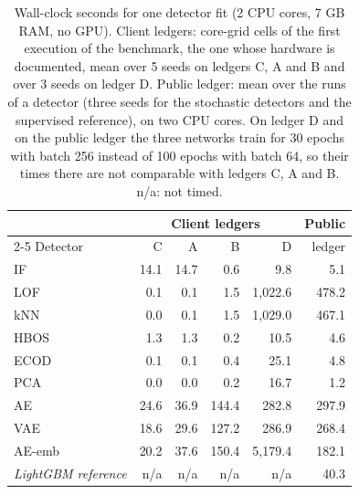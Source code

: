 \begin{table}[tbp]
\caption{Wall-clock seconds for one detector fit (2 CPU cores, 7 GB RAM, no GPU). Client ledgers: core-grid cells of the first execution of the benchmark, the one whose hardware is documented, mean over 5 seeds on ledgers C, A and B and over 3 seeds on ledger D. Public ledger: mean over the runs of a detector (three seeds for the stochastic detectors and the supervised reference), on two CPU cores. On ledger D and on the public ledger the three networks train for 30 epochs with batch 256 instead of 100 epochs with batch 64, so their times there are not comparable with ledgers C, A and B. n/a: not timed.}
\label{tab:s-runtime}
\centering
\footnotesize
\begin{tabular}{@{}lrrrrr@{}}
\toprule
 & \multicolumn{4}{c}{Client ledgers} & Public \\
\cmidrule(lr){2-5}
Detector & C & A & B & D & ledger \\
\midrule
IF & 14.1 & 14.7 & 0.6 & 9.8 & 5.1 \\
LOF & 0.1 & 0.1 & 1.5 & 1,022.6 & 478.2 \\
kNN & 0.0 & 0.1 & 1.5 & 1,029.0 & 467.1 \\
HBOS & 1.3 & 1.3 & 0.2 & 10.5 & 4.6 \\
ECOD & 0.1 & 0.1 & 0.4 & 25.1 & 4.8 \\
PCA & 0.0 & 0.0 & 0.2 & 16.7 & 1.2 \\
AE & 24.6 & 36.9 & 144.4 & 282.8 & 297.9 \\
VAE & 18.6 & 29.6 & 127.2 & 286.9 & 268.4 \\
AE-emb & 20.2 & 37.6 & 150.4 & 5,179.4 & 182.1 \\
\addlinespace
\textit{LightGBM reference} & n/a & n/a & n/a & n/a & 40.3 \\
\bottomrule
\end{tabular}
\end{table}
